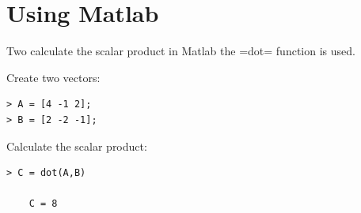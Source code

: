\documentclass[12pt,a4paper]{article}
\theoremstyle{clearprint}
\begin{document}
\section{Using Matlab}

Two calculate the scalar product in Matlab the \spverb=dot= function is used. 

Create two vectors:
\begin{lstlisting}
> A = [4 -1 2];
> B = [2 -2 -1];
\end{lstlisting}

Calculate the scalar product:
\begin{lstlisting}
> C = dot(A,B)
    
    C = 8
\end{lstlisting}
\end{document}
